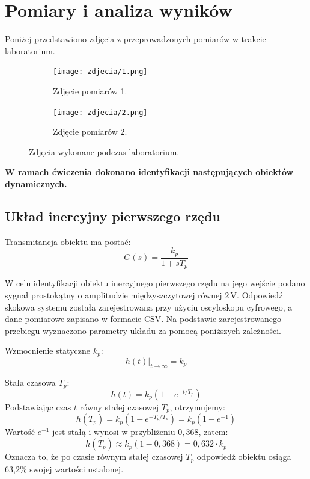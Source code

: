 \documentclass[12pt,a4paper]{article}
\begin{document}
	\section{Pomiary i analiza wyników}
	Poniżej przedstawiono zdjęcia z przeprowadzonych pomiarów w trakcie laboratorium.
	
	\begin{figure}[H]
		\centering
		\begin{subfigure}[b]{0.48\textwidth}
			\centering
			\texttt{[image: zdjecia/1.png]}
			\caption{Zdjęcie pomiarów 1.}
			\label{fig:pomiar1}
		\end{subfigure}
		\hfill
		\begin{subfigure}[b]{0.48\textwidth}
			\centering
			\texttt{[image: zdjecia/2.png]}
			\caption{Zdjęcie pomiarów 2.}
			\label{fig:pomiar2}
		\end{subfigure}
		\caption{Zdjęcia wykonane podczas laboratorium.}
	\end{figure}
	
	\textbf{W ramach ćwiczenia dokonano identyfikacji następujących obiektów dynamicznych.}
	
	\subsection{Układ inercyjny pierwszego rzędu}
	
	Transmitancja obiektu ma postać:
	\begin{equation}
		G(s) = \frac{k_p}{1 + sT_p}
	\end{equation}
	
	W celu identyfikacji obiektu inercyjnego pierwszego rzędu na jego wejście podano sygnał prostokątny o amplitudzie międzyszczytowej równej \(2\,\text{V}\). Odpowiedź skokowa systemu została zarejestrowana przy użyciu oscyloskopu cyfrowego, a dane pomiarowe zapisano w formacie CSV. Na podstawie zarejestrowanego przebiegu wyznaczono parametry układu za pomocą poniższych zależności.
	
	Wzmocnienie statyczne \(k_p\):
	\begin{equation}
		h(t)\big|_{t \to \infty} = k_p
	\end{equation}
	
	Stała czasowa \(T_p\):
	\begin{equation}
		h(t) = k_p(1-e^{-t/T_p})
	\end{equation}
	Podstawiając czas $t$ równy stałej czasowej $T_p$, otrzymujemy:
	\begin{equation}
		h(T_p) = k_p(1-e^{-T_p/T_p}) = k_p(1-e^{-1})
	\end{equation}
	Wartość $e^{-1}$ jest stałą i wynosi w przybliżeniu $0{,}368$, zatem:
	\begin{equation}
		h(T_p) \approx k_p(1-0{,}368) = 0{,}632 \cdot k_p
	\end{equation}
	Oznacza to, że po czasie równym stałej czasowej $T_p$ odpowiedź obiektu osiąga 63,2\% swojej wartości ustalonej.
	
\end{document}
